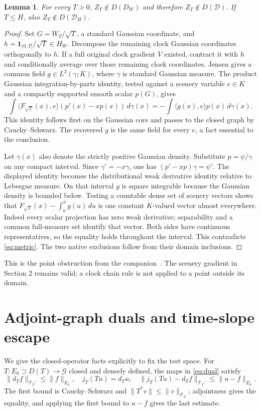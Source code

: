 \documentclass[11pt]{article}
\newtheorem{lemma}[theorem]{Lemma}
\newcommand{\D}{\mathcal D}\newcommand{\G}{\mathcal G}
\begin{document}
\begin{lemma}\label{lem:point}
For every $T>0$, $Z_T\notin D(D_W)$ and therefore $Z_T\notin D(\D)$.
If $T\leq H$, also $Z_T\notin D(\D_H)$.
\end{lemma}
\begin{proof}
Set $G=W_T/\sqrt T$, a standard Gaussian coordinate, and
$h=\mathbf1_{(0,T]}/\sqrt T\in H_W$. Decompose the remaining clock
Gaussian coordinates orthogonally to $h$. If a full original clock
gradient $V$ existed, contract it with $h$ and conditionally average over
those remaining clock coordinates. Jensen gives a common field
$g\in L^2(\gamma;K)$, where $\gamma$ is standard Gaussian measure.
The product Gaussian integration-by-parts identity, tested against a
scenery variable $e\in K$ and a compactly supported smooth scalar
$p(G)$, gives
\[
 \int\langle F_{\sqrt T}(x),e\rangle(p'(x)-xp(x))\,d\gamma(x)
 =-\int\langle g(x),e\rangle p(x)\,d\gamma(x).
\]
This identity follows first on the Gaussian core and passes to the
closed graph by Cauchy--Schwarz. The recovered $g$ is the same field
for every $e$, a fact essential to the conclusion.

Let $\gamma(x)$ also denote the strictly positive Gaussian density.
Substitute $p=\psi/\gamma$ on any compact interval. Since
$\gamma'=-x\gamma$, one has $(p'-xp)\gamma=\psi'$. The displayed
identity becomes the distributional weak derivative identity relative
to Lebesgue measure. On that interval $g$ is square integrable because
the Gaussian density is bounded below. Testing a countable dense set
of scenery vectors shows that
$F_{\sqrt T}(x)-\int_a^xg(u)\,du$ is one constant $K$-valued vector
almost everywhere. Indeed every scalar projection has zero weak
derivative; separability and a common full-measure set identify that
vector. Both sides have continuous representatives, so the equality
holds throughout the interval. This contradicts \eqref{eq:metric}.
The two native exclusions follow from their domain inclusions.
\end{proof}

This is the point obstruction from the companion~\cite{clock}. The
scenery gradient in Section 2 remains valid; a clock chain rule is not
applied to a point outside its domain.

\section{Adjoint-graph duals and time-slope escape}
We give the closed-operator facts explicitly to fix the test space.
For $T:E_0\supset D(T)\to\G$ closed and densely defined, the maps in
\eqref{eq:dual} satisfy
\begin{equation}\label{eq:bounds}
 \|d_Tf\|_{\mathcal T_T'}\leq\|f\|_{E_0},\quad
 j_T(Tu)=d_Tu,\quad
 \|j_T(Tu)-d_Tf\|_{\mathcal T_T'}\leq\|u-f\|_{E_0}.
\end{equation}
The first bound is Cauchy--Schwarz and $\|T^*v\|\leq\|v\|_{\mathcal T_T}$;
adjointness gives the equality, and applying the first bound to $u-f$
gives the last estimate.
\end{document}
